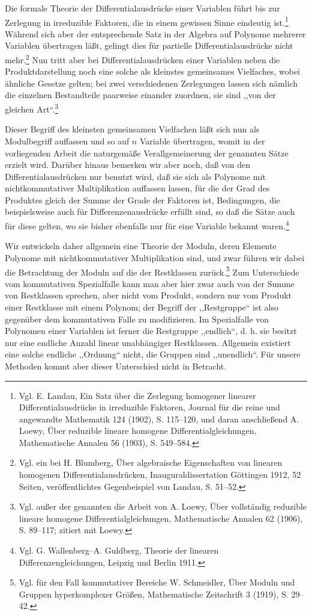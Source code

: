 \documentclass[11pt]{article}
\begin{document}
Die formale Theorie der Differentialausdrücke einer Variablen führt bis zur Zerlegung in irreduzible Faktoren, die in einem gewissen Sinne eindeutig ist.\footnote{Vgl. E. Landau, Ein Satz über die Zerlegung homogener linearer Differentialausdrücke in irreduzible Faktoren, Journal für die reine und angewandte Mathematik 124 (1902), S. 115--120, und daran anschließend A. Loewy, Über reduzible lineare homogene Differentialgleichungen, Mathematische Annalen 56 (1903), S. 549--584.} Während sich aber der entsprechende Satz in der Algebra auf Polynome mehrerer Variablen übertragen läßt, gelingt dies für partielle Differentialausdrücke nicht mehr.\footnote{Vgl. ein bei H. Blumberg, Über algebraische Eigenschaften von linearen homogenen Differentialausdrücken, Inauguraldissertation Göttingen 1912, 52 Seiten, veröffentlichtes Gegenbeispiel von Landau, S. 51--52.} Nun tritt aber bei Differentialausdrücken einer Variablen neben die Produktdarstellung noch eine solche als kleinstes gemeinsames Vielfaches, wobei ähnliche Gesetze gelten; bei zwei verschiedenen Zerlegungen lassen sich nämlich die einzelnen Bestandteile paarweise einander zuordnen, sie sind ,,von der gleichen Art``.\footnote{Vgl. außer der genannten die Arbeit von A. Loewy, Über vollständig reduzible lineare homogene Differentialgleichungen, Mathematische Annalen 62 (1906), S. 89--117; zitiert mit Loewy.}

Dieser Begriff des kleinsten gemeinsamen Vielfachen läßt sich nun als Modulbegriff auffassen und so auf $n$ Variable übertragen, womit in der vorliegenden Arbeit die naturgemäße Verallgemeinerung der genannten Sätze erzielt wird. Darüber hinaus bemerken wir aber noch, daß von den Differentialausdrücken nur benutzt wird, daß sie sich als Polynome mit nichtkommutativer Multiplikation auffassen lassen, für die der Grad des Produktes gleich der Summe der Grade der Faktoren ist, Bedingungen, die beispielsweise auch für Differenzenausdrücke erfüllt sind, so daß die Sätze auch für diese gelten, wo sie bisher ebenfalls nur für eine Variable bekannt waren.\footnote{Vgl. G. Wallenberg--A. Guldberg, Theorie der linearen Differenzengleichungen, Leipzig und Berlin 1911.}

Wir entwickeln daher allgemein eine Theorie der Moduln, deren Elemente Polynome mit nichtkommutativer Multiplikation sind, und zwar führen wir dabei die Betrachtung der Moduln auf die der Restklassen zurück.\footnote{Vgl. für den Fall kommutativer Bereiche W. Schmeidler, Über Moduln und Gruppen hyperkomplexer Größen, Mathematische Zeitschrift 3 (1919), S. 29--42.} Zum Unterschiede vom kommutativen Spezialfalle kann man aber hier zwar auch von der Summe von Restklassen sprechen, aber nicht vom Produkt, sondern nur vom Produkt einer Restklasse mit einem Polynom; der Begriff der ,,Restgruppe`` ist also gegenüber dem kommutativen Falle zu modifizieren. Im Spezialfalle von Polynomen einer Variablen ist ferner die Restgruppe ,,endlich``, d. h. sie besitzt nur eine endliche Anzahl linear unabhängiger Restklassen. Allgemein existiert eine solche endliche ,,Ordnung`` nicht, die Gruppen sind ,,unendlich``. Für unsere Methoden kommt aber dieser Unterschied nicht in Betracht.
\end{document}
